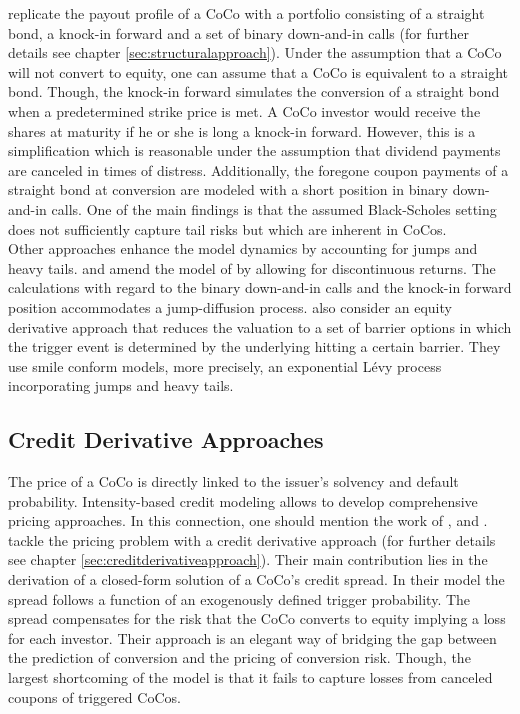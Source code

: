 \citet{de2011pricing} replicate the payout profile of a CoCo with a portfolio consisting of a straight bond, a knock-in forward and a set of binary down-and-in calls (for further details see chapter \ref{sec:structuralapproach}). Under the assumption that a CoCo will not convert to equity, one can assume that a CoCo is equivalent to a straight bond. Though, the knock-in forward simulates the conversion of a straight bond when a predetermined strike price is met. A CoCo investor would receive the shares at maturity if he or she is long a knock-in forward. However, this is a simplification which is reasonable under the assumption that dividend payments are canceled in times of distress. Additionally, the foregone coupon payments of a straight bond at conversion are modeled with a short position in binary down-and-in calls. One of the main findings is that the assumed Black-Scholes setting does not sufficiently capture tail risks but which are inherent in CoCos.\\

Other approaches enhance the model dynamics by accounting for jumps and heavy tails. \citet{erismann2015pricing} and \citet{teneberg2012equity} amend the model of \citet{de2011pricing} by allowing for discontinuous returns. The calculations with regard to the binary down-and-in calls and the knock-in forward position accommodates a jump-diffusion process. \citet{corcuera2013pricing} also consider an equity derivative approach that reduces the valuation to a set of barrier options in which the trigger event is determined by the underlying hitting a certain barrier. They use smile conform models, more precisely, an exponential L\'{e}vy process incorporating jumps and heavy tails.

\subsection*{Credit Derivative Approaches}
The price of a CoCo is directly linked to the issuer's solvency and default probability. Intensity-based credit modeling allows to develop comprehensive pricing approaches. In this connection, one should mention the work of \citet{de2011pricing}, \citet{serjantov2011hybrid} and \citet{erismann2015pricing}. \\

\citet{de2011pricing} tackle the pricing problem with a credit derivative approach (for further details see chapter \ref{sec:creditderivativeapproach}). Their main contribution lies in the derivation of a closed-form solution of a CoCo's credit spread. In their model the spread follows a function of an exogenously defined trigger probability. The spread compensates for the risk that the CoCo converts to equity implying a loss for each investor. Their approach is an elegant way of bridging the gap between the prediction of conversion and the pricing of conversion risk. Though, the largest shortcoming of the model is that it fails to capture losses from canceled coupons of triggered CoCos.\\

